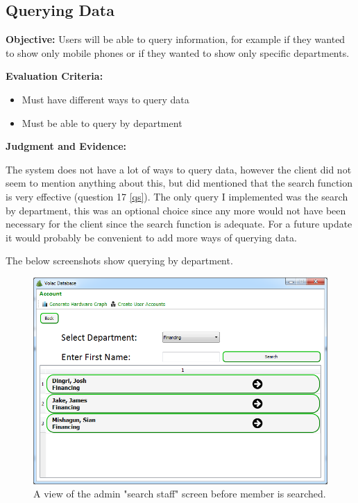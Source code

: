 \subsection{Querying Data}\label{queryf}

\textbf{Objective:} Users will be able to query information, for example if they wanted to show only mobile phones or if they wanted to show only specific departments.

\textbf{Evaluation Criteria:}
\begin{itemize}
\item{Must have different ways to query data}
\item{Must be able to query by department}
\end{itemize}

\textbf{Judgment and Evidence:}

The system does not have a lot of ways to query data, however the client did not seem to mention anything about this, but did mentioned that the search function is very effective (question 17 \ref{qs}). The only query I implemented was the search by department, this was an optional choice since any more would not have been necessary for the client since the search function is adequate. For a future update it would probably be convenient to add more ways of querying data.

The below screenshots show querying by department.

\begin{figure}[H]
    \includegraphics[width=\textwidth]{./Evaluation/Images/beforeadv.png}
    \caption{A view of the admin "search staff" screen before member is searched.} 
\end{figure}

